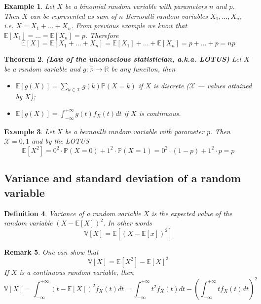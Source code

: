 \documentclass[12pt]{article}
\newtheorem{theorem}{Theorem}[subsection]
\newtheorem{remark}[theorem]{Remark}
\newtheorem{definition}[theorem]{Definition}
\newtheorem{example}[theorem]{Example}
\begin{document}
\begin{example} Let $X$ be a binomial random variable with parameters $n$ and $p$. Then $X$ can be represented as sum of $n$ Bernoulli random variables $X_1,\ldots,X_n$, i.e. $X=X_1+\ldots+X_n$. From previous example we know that $\mathbb{E}[X_1]=\ldots=\mathbb{E}[X_n]=p$. Therefore
$$
\mathbb{E}[X]=\mathbb{E}[X_1+\ldots+X_n]=\mathbb{E}[X_1]+\ldots+\mathbb{E}[X_n]=p+\ldots+p=np
$$
\end{example}

\begin{theorem} \textbf{(Law of the unconscious statistician, a.k.a. LOTUS)} Let $X$ be a random variable and $g:\mathbb{R}\to\mathbb{R}$ be any funciton, then
\begin{itemize}
    \item $\mathbb{E}[g(X)]=\sum_{k\in\mathcal{X}}g(k)\mathbb{P}(X=k)$ if $X$ is discrete ($\mathcal{X}$ --- values attained by $X$);
    \item $\mathbb{E}[g(X)]=\int_{-\infty}^{+\infty} g(t)f_X(t)dt$ if $X$ is continuous.
\end{itemize}
\end{theorem}

\begin{example} Let $X$ be a bernoulli random variable with parameter $p$. Then $\mathcal{X}={0,1}$ and by the LOTUS
$$
\mathbb{E}[X^2]=0^2\cdot\mathbb{P}(X=0)+1^2\cdot\mathbb{P}(X=1)=0^2\cdot (1-p)+1^2\cdot p=p
$$
\end{example}


\subsection{Variance and standard deviation of a random variable}

\begin{definition} Variance of a random variable $X$ is the expected value of the random variable $(X-\mathbb{E}[X])^2$. In other words
$$
\mathbb{V}[X]=\mathbb{E}[(X-\mathbb{E}[x])^2]
$$
\end{definition}

\begin{remark} One can show that
$$
\mathbb{V}[X]=\mathbb{E}[X^2]-\mathbb{E}[X]^2
$$
If $X$ is a continuous random variable, then
$$
\mathbb{V}[X]
=\int_{-\infty}^{+\infty} (t-\mathbb{E}[X])^2 f_X(t)dt
=\int_{-\infty}^{+\infty} t^2 f_X(t)dt-\left( \int_{-\infty}^{+\infty} t f_X(t)dt\right)^2
$$
\end{remark}
\end{document}
